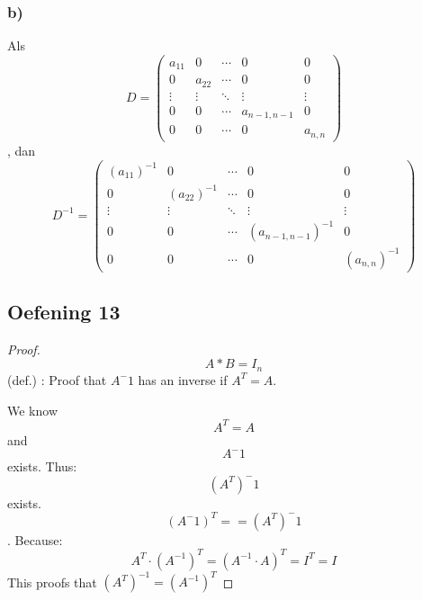 \documentclass[lineaire_algebra_oplossingen.tex]{subfiles}
\begin{document}
\subsubsection*{b)}
Als
$$ D = \begin{pmatrix}
a_{11} & 0 & \cdots & 0 & 0\\
0 & a_{22} & \cdots & 0 & 0\\
\vdots & \vdots & \ddots & \vdots & \vdots\\
0 & 0 & \cdots & a_{n-1,n-1} & 0 \\
0 & 0 & \cdots & 0 & a_{n,n}
\end{pmatrix}
$$, dan
$$ D^{-1} = \begin{pmatrix}
(a_{11})^{-1} & 0 & \cdots & 0 & 0\\
0 & (a_{22})^{-1} & \cdots & 0 & 0\\
\vdots & \vdots & \ddots & \vdots & \vdots\\
0 & 0 & \cdots & (a_{n-1,n-1})^{-1} & 0 \\
0 & 0 & \cdots & 0 & (a_{n,n})^{-1}
\end{pmatrix}
$$

\subsection{Oefening 13}

\begin{proof}

\[A*B = I_{n} \] (def.) : Proof that $A^-1$ has an inverse if $ A^T = A $.

We know \[A^T = A \] and \[ A^-1 \] exists.
Thus: \[(A^T)^-1 \] exists.
\[ (A^-1)^T ==  (A^T)^-1 \].
Because:
$$A^T\cdot (A^{-1})^T = (A^{-1}\cdot A)^T = I^T = I$$
This proofs that $(A^T)^{-1} = (A^{-1})^T$
\end{proof}
\end{document}
